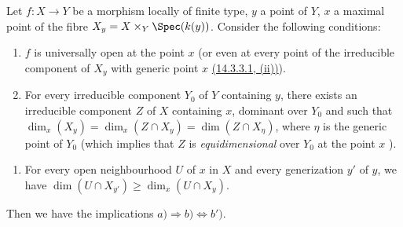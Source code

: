 \begin{proposition}[14.3.13]
\label{IV.14.3.13}
Let $f:X\to Y$ be a morphism locally of finite type, $y$ a point of $Y$, $x$ a maximal point of the fibre $X_y=X\times_Y\Spec(k(y))$.
Consider the following conditions:
\begin{enumerate}[label=\emph{\alph*)}]
  \item $f$ is universally open at the point $x$ (or even at every point of the irreducible component of $X_y$ with generic point $x$ \hyperref[IV.14.3.3.1]{(14.3.3.1, (ii))}).
  \item For every irreducible component $Y_0$ of $Y$ containing $y$, there exists an irreducible component $Z$ of $X$ containing $x$, dominant over $Y_0$ and such that $\dim_x(X_y)=\dim_x(Z\cap X_y)=\dim(Z\cap X_\eta)$, where $\eta$ is the generic point of $Y_0$ (which implies that $Z$ is \emph{equidimensional} over $Y_0$ at the point $x$ ).
\end{enumerate}


\begin{enumerate}[label=\emph{\alph*$'$)}]
  \item[b$'$)] For every open neighbourhood $U$ of $x$ in $X$ and every generization $y'$ of $y$, we have $\dim(U\cap X_{y'})\geq\dim_x(U\cap X_y)$.
\end{enumerate}

Then we have the implications $a)\Rightarrow b)\Leftrightarrow b')$.
\end{proposition}

